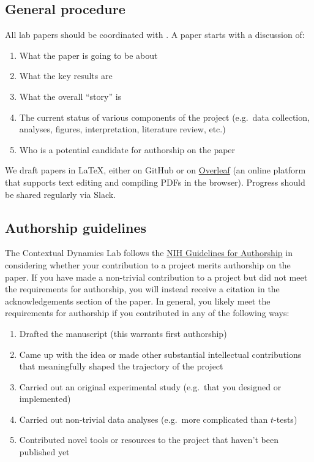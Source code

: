 \documentclass{tufte-book} %
\begin{document}
\subsection{General procedure}
All lab papers should be coordinated with \director.  A paper starts
with a discussion of:
\begin{enumerate}
\item What the paper is going to be about
\item What the key results are
\item What the overall ``story'' is
\item The current status of various components of the project
  (e.g.\ data collection, analyses, figures, interpretation,
  literature review, etc.)
\item Who is a potential candidate for authorship on the paper
\end{enumerate}

We draft papers in \LaTeX, either on GitHub or on
\href{https://www.overleaf.com/}{Overleaf} (an online platform that
supports text editing and compiling PDFs in the browser).  Progress
should be shared regularly via Slack.

\subsection{Authorship guidelines}
  The Contextual Dynamics Lab follows
the
\href{https://oir.nih.gov/sites/default/files/uploads/sourcebook/documents/ethical_conduct/guidelines-authorship_contributions.pdf}{NIH
  Guidelines for Authorship} in considering whether your contribution
to a project merits authorship on the paper.  If you have made a
non-trivial contribution to a project but did not meet the
requirements for authorship, you will instead receive a citation in
the acknowledgements section of the paper.  In general, you likely
meet the requirements for authorship if you contributed in any of the
following ways:
\begin{enumerate}
\item Drafted the manuscript (this warrants first authorship)
\item Came up with the idea or made other substantial intellectual
  contributions that meaningfully shaped the trajectory of the project
\item Carried out an original experimental study (e.g.\ that you
  designed or implemented)
\item Carried out non-trivial data analyses (e.g.\ more complicated
  than $t$-tests)
\item Contributed novel tools or resources to the project that haven't
  been published yet
\end{enumerate}
\end{document}
